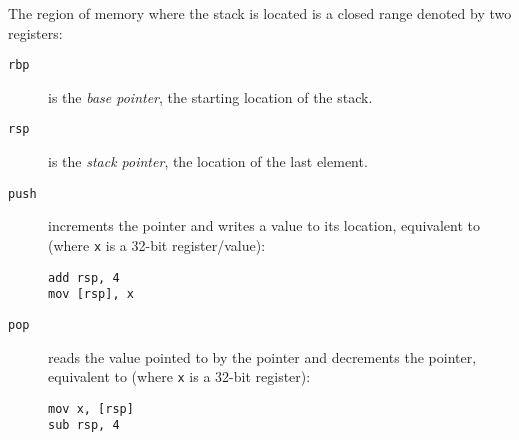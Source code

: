 The region of memory where the stack is located is a closed range
denoted by two registers\footnotemark:


\begin{description}
    \item[\texttt{rbp}]
        is the \textit{base pointer}, the starting location of the stack.
    \item[\texttt{rsp}]
        is the \textit{stack pointer}, the location of the last element.
\end{description}

\begin{description}
    \item[\texttt{push}]
        increments the pointer and writes a value to its location, equivalent
        to (where \texttt{x} is a 32-bit register/value):
        \begin{lstlisting}[style=x86]
add rsp, 4
mov [rsp], x
        \end{lstlisting}
    \item[\texttt{pop}]
        reads the value pointed to by the pointer and decrements the pointer,
        equivalent to (where \texttt{x} is a 32-bit register):
        \begin{lstlisting}[style=x86]
mov x, [rsp]
sub rsp, 4
        \end{lstlisting}
\end{description}
